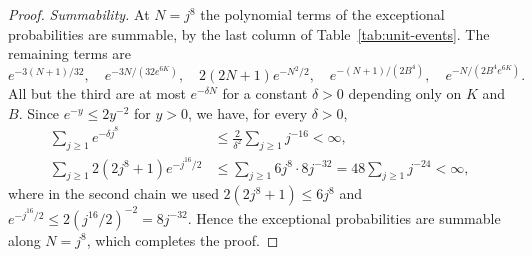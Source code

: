 \begin{proof}
\medskip
\noindent\emph{Summability.}
At $N=j^8$ the polynomial terms of the exceptional probabilities are
summable, by the last column of Table~\ref{tab:unit-events}.
The remaining terms are
\[
 e^{-3(N+1)/32},\quad e^{-3N/(32e^{6K})},\quad 2(2N+1)e^{-N^2/2},\quad
 e^{-(N+1)/(2B^4)},\quad e^{-N/(2B^4e^{6K})}.
\]
All but the third are at most $e^{-\delta N}$ for a constant $\delta>0$
depending only on $K$ and $B$.
Since $e^{-y}\le2y^{-2}$ for $y>0$, we have, for every $\delta>0$,
\begin{equation}
 \begin{aligned}
 \sum_{j\ge1}e^{-\delta j^8}&\le\frac2{\delta^2}\sum_{j\ge1}j^{-16}<\infty,\\
 \sum_{j\ge1}2(2j^8+1)e^{-j^{16}/2}&\le\sum_{j\ge1}6j^8\cdot8j^{-32}
 =48\sum_{j\ge1}j^{-24}<\infty,
 \end{aligned}\label{eq:model-summable}
\end{equation}
where in the second chain we used $2(2j^8+1)\le6j^8$ and
$e^{-j^{16}/2}\le2(j^{16}/2)^{-2}=8j^{-32}$.
Hence the exceptional probabilities are summable along $N=j^8$, which
completes the proof.
\end{proof}
